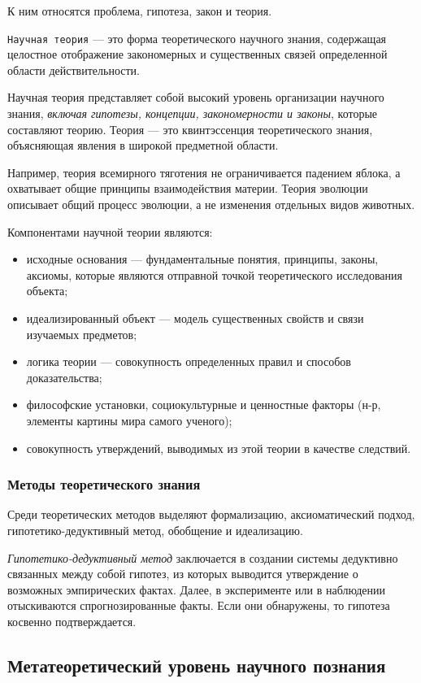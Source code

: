 К ним относятся проблема, гипотеза, закон и теория.

\texttt{Научная теория} --- это форма теоретического научного знания, содержащая целостное
отображение закономерных и существенных связей определенной области действительности.

Научная теория представляет собой высокий уровень организации научного знания, \textit{включая гипотезы, концепции, закономерности и законы}, которые составляют теорию. Теория --- это квинтэссенция теоретического знания, объясняющая явления в широкой предметной области. 

Например, теория всемирного тяготения не ограничивается падением яблока, а охватывает общие принципы взаимодействия материи. Теория эволюции описывает общий процесс эволюции, а не изменения отдельных видов животных.

Компонентами научной теории являются: 
\begin{itemize}
    \item исходные основания --- фундаментальные понятия, принципы, законы, аксиомы,
    которые являются отправной точкой теоретического исследования объекта;
    \item идеализированный объект --- модель существенных свойств и связи
    изучаемых предметов;
    \item логика теории --- совокупность определенных правил и способов доказательства;
    \item философские установки, социокультурные и ценностные факторы (н-р, элементы картины мира самого ученого);
    \item совокупность утверждений, выводимых из этой теории в качестве следствий.
\end{itemize}

\subsubsection{Методы теоретического знания}

Среди теоретических методов выделяют формализацию, аксиоматический подход, гипотетико-дедуктивный метод, обобщение и идеализацию. 

\textit{Гипотетико-дедуктивный метод} заключается в создании системы дедуктивно связанных между
собой гипотез, из которых выводится утверждение о возможных эмпирических фактах. Далее, в эксперименте или в наблюдении отыскиваются спрогнозированные факты. Если они
обнаружены, то гипотеза косвенно подтверждается.  

\subsection{Метатеоретический уровень научного познания}

